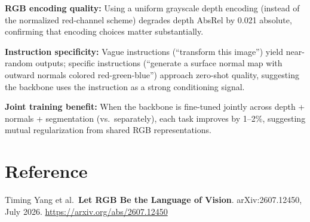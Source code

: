 \documentclass[10pt,twocolumn]{article}
\begin{document}
\textbf{RGB encoding quality:} Using a uniform grayscale depth
encoding (instead of the normalized red-channel scheme) degrades
depth AbsRel by 0.021 absolute, confirming that encoding choices
matter substantially.

\textbf{Instruction specificity:} Vague instructions (``transform
this image'') yield near-random outputs; specific instructions
(``generate a surface normal map with outward normals colored
red-green-blue'') approach zero-shot quality, suggesting the backbone
uses the instruction as a strong conditioning signal.

\textbf{Joint training benefit:} When the backbone is fine-tuned
jointly across depth + normals + segmentation (vs.\ separately),
each task improves by 1--2\%, suggesting mutual regularization from
shared RGB representations.

\section*{Reference}

Timing Yang et al.\
\textbf{Let RGB Be the Language of Vision}.
arXiv:2607.12450, July 2026.
\url{https://arxiv.org/abs/2607.12450}
\end{document}

